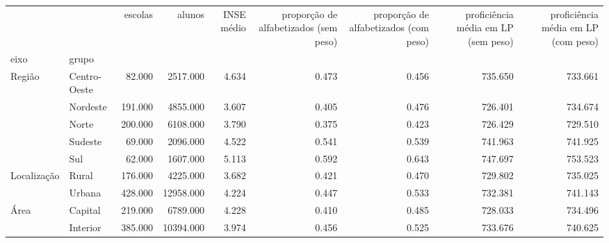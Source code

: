 \begin{tabular}{llrrrrrrr}
\toprule
 &  & escolas & alunos & INSE médio & proporção de alfabetizados (sem peso) & proporção de alfabetizados (com peso) & proficiência média em LP (sem peso) & proficiência média em LP (com peso) \\
eixo & grupo &  &  &  &  &  &  &  \\
\midrule
\multirow[t]{5}{*}{Região} & Centro-Oeste & 82.000 & 2517.000 & 4.634 & 0.473 & 0.456 & 735.650 & 733.661 \\
 & Nordeste & 191.000 & 4855.000 & 3.607 & 0.405 & 0.476 & 726.401 & 734.674 \\
 & Norte & 200.000 & 6108.000 & 3.790 & 0.375 & 0.423 & 726.429 & 729.510 \\
 & Sudeste & 69.000 & 2096.000 & 4.522 & 0.541 & 0.539 & 741.963 & 741.925 \\
 & Sul & 62.000 & 1607.000 & 5.113 & 0.592 & 0.643 & 747.697 & 753.523 \\
\cline{1-9}
\multirow[t]{2}{*}{Localização} & Rural & 176.000 & 4225.000 & 3.682 & 0.421 & 0.470 & 729.802 & 735.025 \\
 & Urbana & 428.000 & 12958.000 & 4.224 & 0.447 & 0.533 & 732.381 & 741.143 \\
\cline{1-9}
\multirow[t]{2}{*}{Área} & Capital & 219.000 & 6789.000 & 4.228 & 0.410 & 0.485 & 728.033 & 734.496 \\
 & Interior & 385.000 & 10394.000 & 3.974 & 0.456 & 0.525 & 733.676 & 740.625 \\
\cline{1-9}
\bottomrule
\end{tabular}
